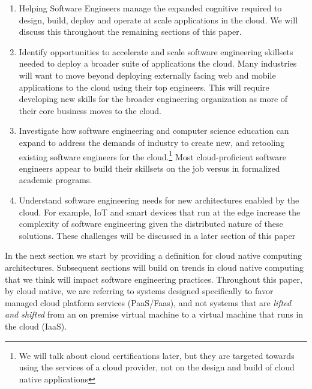 \documentclass[conference]{IEEEtran}
\begin{document}
\begin{enumerate}
	\item Helping Software Engineers manage the expanded cognitive required to design, build, deploy and operate at scale  applications in the cloud. We will discuss this throughout the remaining sections of this paper. 
	
	\item Identify opportunities to accelerate and scale software engineering skillsets needed to deploy a broader suite of applications the cloud. Many industries will want to move beyond deploying externally facing web and mobile applications to the cloud using their top engineers. This will require developing new skills for the broader engineering organization as more of their core business moves to the cloud.
	
	\item Investigate how software engineering and computer science education can expand to address the demands of industry to create new, and retooling existing software engineers for the cloud.\footnote{We will talk about cloud certifications later, but they are targeted towards using the services of a cloud provider, not on the design and build of cloud native applications} Most cloud-proficient software engineers appear to build their skillsets on the job versus in formalized academic programs. 
	
	\item Understand software engineering needs for new architectures enabled by the cloud.  For example, IoT and smart devices that run at the edge increase the complexity of software engineering given the  distributed nature of these solutions.  These challenges will be discussed in a later section of this paper
\end{enumerate}

In the next section we start by providing a definition for cloud native computing architectures. Subsequent sections will build on trends in cloud native computing that we think will impact software engineering practices.  Throughout this paper, by cloud native, we are referring to systems designed specifically to favor managed cloud platform services (PaaS/Faas)\cite{albuquerque2017function}, and not systems that are \textit{lifted and shifted}\cite{CloudMigration2017} from an on premise virtual machine to a virtual machine that runs in the cloud (IaaS). 
\end{document}

